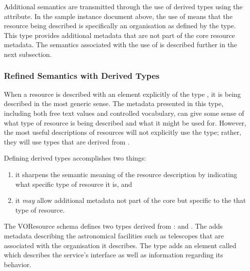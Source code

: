 \documentclass[11pt,a4paper]{ivoa}
\begin{document}
Additional semantics are transmitted through the use of derived types
using the  attribute.  In the sample instance document
above, the use of  means that the
resource being described is specifically an organisation as defined by
the  type.  This type provides additional
metadata that are not part of the core resource metadata.  The semantics
associated with the use of  is described further in the
next subsection.



\subsubsection{Refined Semantics with Derived Types}
\label{sect:derivedtypes}

When a resource is described with an element explicitly of the type
, it is being described in the most generic
sense.  The metadata presented in this type, including both free text
values and controlled vocabulary, can give some sense of what
type of resource is being described and what it might be used for.
However, the most useful descriptions of resources will not explicitly
use the  type; rather, they will use types
that are derived from .  



Defining derived  types accomplishes two
things:
\begin{enumerate}
  \item it sharpens the semantic meaning of the resource description by
       indicating what specific type of resource it is, and
  \item it \emph{may} allow additional metadata not part of the core
       but specific to the that type of resource.
\end{enumerate}



The VOResource schema defines two types derived from
:   and
.   The  adds
metadata describing the astronomical facilities such as telescopes
that are associated with the organisation it describes.  The
 type adds an element called
 which describes the service's interface as
well as information regarding its behavior.  
\end{document}
